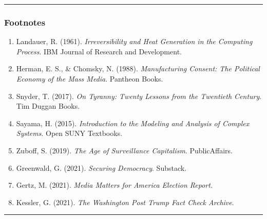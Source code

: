 \documentclass[
]{article}
\providecommand{\tightlist}{%
  \setlength{\itemsep}{0pt}\setlength{\parskip}{0pt}}
\begin{document}
\begin{center}\rule{0.5\linewidth}{0.5pt}\end{center}

\subsubsection{Footnotes}\label{footnotes}

\begin{enumerate}
\def\labelenumi{\arabic{enumi}.}
\tightlist
\item
  Landauer, R. (1961). \emph{Irreversibility and Heat Generation in the Computing Process}. IBM Journal of Research and Development.
\item
  Herman, E. S., \& Chomsky, N. (1988). \emph{Manufacturing Consent: The Political Economy of the Mass Media}. Pantheon Books.
\item
  Snyder, T. (2017). \emph{On Tyranny: Twenty Lessons from the Twentieth Century}. Tim Duggan Books.
\item
  Sayama, H. (2015). \emph{Introduction to the Modeling and Analysis of Complex Systems}. Open SUNY Textbooks.
\item
  Zuboff, S. (2019). \emph{The Age of Surveillance Capitalism}. PublicAffairs.
\item
  Greenwald, G. (2021). \emph{Securing Democracy}. Substack.
\item
  Gertz, M. (2021). \emph{Media Matters for America Election Report.}
\item
  Kessler, G. (2021). \emph{The Washington Post Trump Fact Check Archive}.
\end{enumerate}

\begin{center}\rule{0.5\linewidth}{0.5pt}\end{center}
\end{document}
